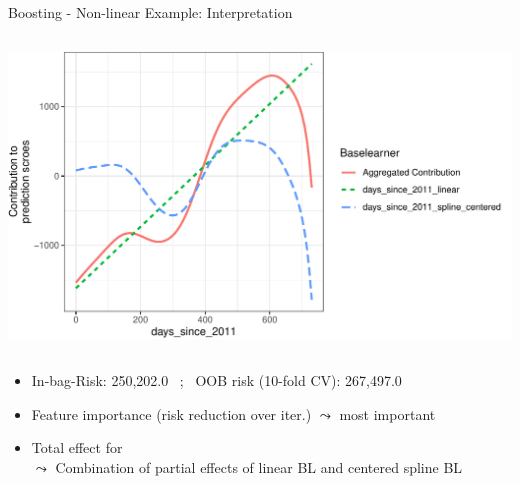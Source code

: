 \documentclass[11pt,compress,t,notes=noshow, aspectratio=169, xcolor=table]{beamer}
\begin{document}
\begin{frame}{Boosting - Non-linear Example: Interpretation}
\begin{columns}[T, totalwidth = \linewidth]
{\begin{column}{0.5\linewidth}
  \includegraphics[width = \linewidth]{figure/compboost_pfe.pdf}
\end{column}
}
\end{columns}
\smallskip
\begin{itemize}
    \scriptsize
    \item<2->[$\Rightarrow$] In-bag-Risk: 250,202.0 \, ; \, OOB risk (10-fold CV): 267,497.0
    \item<2->  Feature importance (risk reduction over iter.) $\leadsto$  most important
    \item<2-> Total effect for \\
$\leadsto$ Combination of partial effects of linear BL and centered spline BL
\end{itemize}
\end{frame}






\end{document}
